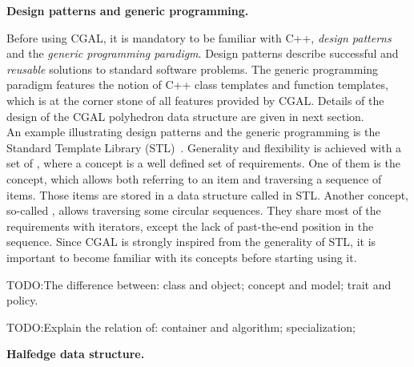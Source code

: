 \noindent \textbf{Design patterns and generic programming.}

Before using CGAL, it is mandatory to be familiar with C++,
\emph{design patterns} and the \emph{generic programming paradigm}. 
Design patterns \cite{Gamma:1995:DP} describe successful and
\emph{reusable} solutions to standard software problems.  The generic
programming paradigm \cite{Alexandrescu:2001:MCD} features the notion
of C++ class templates and function templates, which is at the corner
stone of all features provided by CGAL. Details of the design of the
CGAL polyhedron data structure are given in next section.\\

An example illustrating design patterns and the generic programming is
the Standard Template Library (STL)~\cite{ms-stl-96}. Generality and
flexibility is achieved with a set of , where a
concept is a well defined set of requirements. One of them is the
 concept, which allows both referring to an item and
traversing a sequence of items. Those items are stored in a data
structure called  in STL. Another concept, so-called
, allows traversing some circular sequences. They
share most of the requirements with iterators, except the lack of
past-the-end position in the sequence. Since CGAL is strongly inspired
from the generality of STL, it is important to become familiar with
its concepts before starting using it.



TODO:The difference between: class and object; concept and model;
trait and policy.

TODO:Explain the relation of: container and algorithm; specialization;

\noindent \textbf{Halfedge data structure.}

